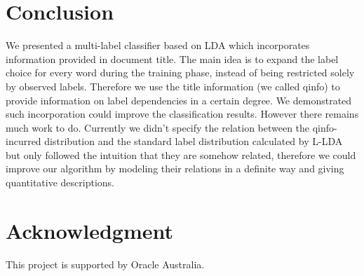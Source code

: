 \section{Conclusion}
We presented a multi-label classifier based on LDA which incorporates 
information provided in document title. The main idea is to
expand the label choice for every word during the training phase,
instead of being restricted solely by observed labels. Therefore we
use the title information (we called qinfo) to provide information on
label dependencies in a certain degree. We demonstrated such incorporation 
could improve the classification results. However there
remains much work to do. Currently we didn't specify the relation 
between the qinfo-incurred distribution and the standard label
distribution calculated by L-LDA but only followed the intuition
that they are somehow related, therefore we could improve our algorithm 
by modeling their relations in a definite way and giving
quantitative descriptions. 


\label{sec:conclude}
\section*{Acknowledgment}

This project is supported by Oracle Australia.

